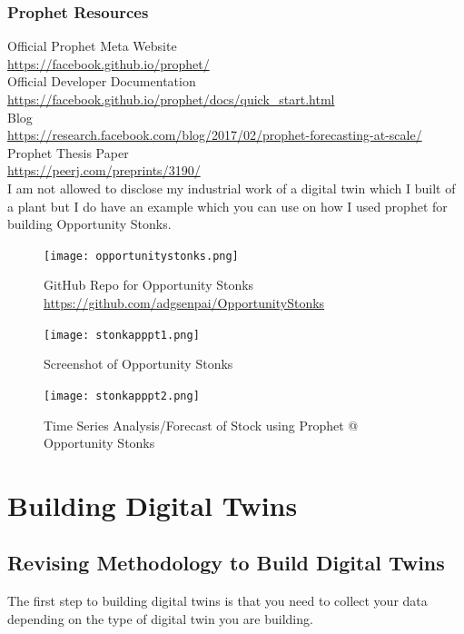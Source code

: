 \subsubsection{Prophet Resources}
Official Prophet Meta Website \\ 
\url{https://facebook.github.io/prophet/} \\
Official Developer Documentation \\
\url{https://facebook.github.io/prophet/docs/quick_start.html} \\
Blog \\
\url{https://research.facebook.com/blog/2017/02/prophet-forecasting-at-scale/}
Prophet Thesis Paper \\
\url{https://peerj.com/preprints/3190/} \\ 
I am not allowed to disclose my industrial work of a digital twin which I built of a plant but I do have an example which you can use on how I used prophet for building Opportunity Stonks. \\ 

\begin{figure}[H]
    \centering
    \texttt{[image: opportunitystonks.png]}
    \caption{GitHub Repo for Opportunity Stonks \url{https://github.com/adgsenpai/OpportunityStonks}}
    \label{fig:opportunitystonks}
\end{figure} 

\begin{figure}[H]
    \centering
    \texttt{[image: stonkapppt1.png]}
    \caption{Screenshot of Opportunity Stonks}
    \label{fig:opportunitystonks2}
\end{figure} 

\begin{figure}[H]
    \centering
    \texttt{[image: stonkapppt2.png]}
    \caption{Time Series Analysis/Forecast of Stock using Prophet @ Opportunity Stonks}
    \label{fig:opportunitystonks3}
\end{figure}

\section{Building Digital Twins}

\subsection{Revising Methodology to Build Digital Twins}

The first step to building digital twins is that you need to collect your data depending on the type of digital twin you are building. \\

